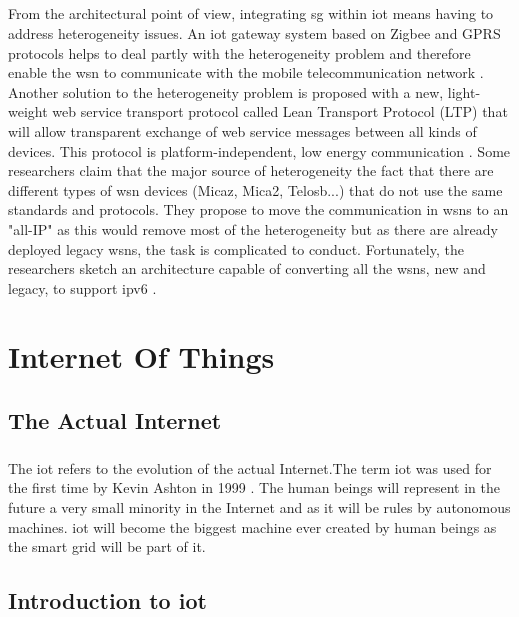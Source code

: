 \documentclass[12pt,a4paper,final]{report}
\begin{document}
\paragraph{}
From the architectural point of view, integrating \gls{sg} within \gls{iot} means having to address heterogeneity issues. An \gls{iot} gateway system based on Zigbee and GPRS protocols helps to deal partly with the heterogeneity problem and therefore enable the \gls{wsn} to communicate with the mobile telecommunication network \cite{ref11}. Another solution to the heterogeneity problem is proposed with a new, light-weight web service transport protocol called Lean Transport Protocol (LTP) that will allow transparent exchange of web service messages between all kinds of devices. This protocol is platform-independent, low energy communication \cite{ref12}. Some researchers claim that the major source of heterogeneity the fact that there are different types of \gls{wsn} devices (Micaz, Mica2, Telosb...) that do not use the same standards and protocols. They propose to move the communication in \glspl{wsn} to an "all-IP" as this would remove most of the heterogeneity but as there are already deployed legacy \glspl{wsn}, the task is complicated to conduct. Fortunately, the researchers sketch an architecture capable of converting all the \glspl{wsn}, new and legacy, to support \gls{ipv6} \cite{ref13}.


\chapter{Internet Of Things}
\section{The Actual Internet}
\paragraph{}
The \gls{iot} refers to the evolution of the actual Internet.The term \gls{iot} was used for the first time by Kevin Ashton in 1999 \cite{ref17}. The human beings will represent in the future a very small minority in the Internet and as it will be rules by autonomous machines. \gls{iot} will become the biggest machine ever created by human beings as the smart grid will be part of it.
\section{Introduction to \gls{iot}}
\end{document}
